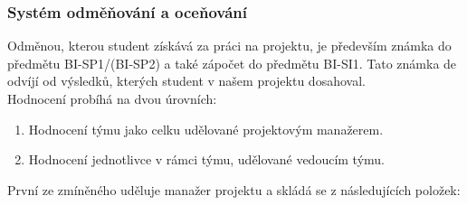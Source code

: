 \subsubsection{Systém odměňování a oceňování} \label{ppl:ranking}
Odměnou, kterou student získává za práci na projektu, je především známka do předmětu BI-SP1/(BI-SP2) a také zápočet do předmětu BI-SI1. Tato známka de odvíjí od výsledků, kterých student v našem projektu dosahoval.\\
Hodnocení probíhá na dvou úrovních:
\begin{enumerate}
	\item Hodnocení týmu jako celku udělované projektovým manažerem.
	\item Hodnocení jednotlivce v rámci týmu, udělované vedoucím týmu.
\end{enumerate}
První ze zmíněného uděluje manažer projektu a skládá se z následujících položek:
